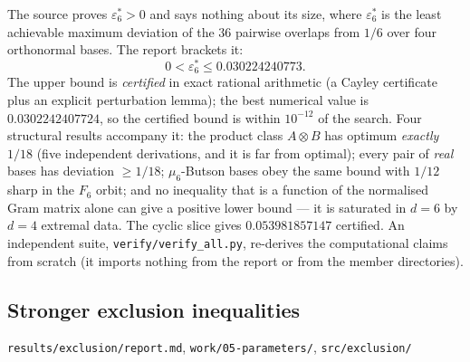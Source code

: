 \documentclass[10pt]{article}
\theoremstyle{definition}
\newcommand{\file}[1]{\texttt{\small #1}}
\begin{document}
The source proves $\varepsilon_6^*>0$ and says nothing about its size, where
$\varepsilon_6^*$ is the least achievable maximum deviation of the $36$ pairwise overlaps from $1/6$
over four orthonormal bases. The report brackets it:
\[
0<\varepsilon_6^*\le 0.030224240773 .
\]
The upper bound is \emph{certified} in exact rational arithmetic (a Cayley certificate plus an
explicit perturbation lemma); the best numerical value is $0.0302242407724$, so the certified bound is
within $10^{-12}$ of the search. Four structural results accompany it: the product class
$A\otimes B$ has optimum \emph{exactly} $1/18$ (five independent derivations, and it is far from
optimal); every pair of \emph{real} bases has deviation $\ge1/18$; $\mu_6$-Butson bases obey the same
bound with $1/12$ sharp in the $F_6$ orbit; and no inequality that is a function of the normalised
Gram matrix alone can give a positive lower bound --- it is saturated in $d=6$ by $d=4$ extremal data.
The cyclic slice gives $0.053981857147$ certified. An independent suite, \file{verify/\allowbreak{}verify\_all.py},
re-derives the computational claims from scratch (it imports nothing from the report or from the
member directories).

\subsection{Stronger exclusion inequalities}
\file{results/\allowbreak{}exclusion/\allowbreak{}report.md}, \file{work/\allowbreak{}05-\allowbreak{}parameters/\allowbreak{}}, \file{src/\allowbreak{}exclusion/\allowbreak{}}
\end{document}
